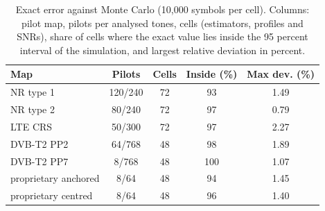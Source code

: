 \begin{table}[t]
\centering
\caption{Exact error against Monte Carlo (10,000 symbols per cell). Columns: pilot map, pilots per analysed tones, cells (estimators, profiles and SNRs), share of cells where the exact value lies inside the 95 percent interval of the simulation, and largest relative deviation in percent.}
\label{tab:validation}
\footnotesize
\setlength{\tabcolsep}{4pt}
\begin{tabular}{lcccc}
\toprule
Map & Pilots & Cells & Inside (\%) & Max dev. (\%) \\
\midrule
NR type 1 & 120/240 & 72 & 93 & 1.49 \\
NR type 2 & 80/240 & 72 & 97 & 0.79 \\
LTE CRS & 50/300 & 72 & 97 & 2.27 \\
DVB-T2 PP2 & 64/768 & 48 & 98 & 1.89 \\
DVB-T2 PP7 & 8/768 & 48 & 100 & 1.07 \\
proprietary anchored & 8/64 & 48 & 94 & 1.45 \\
proprietary centred & 8/64 & 48 & 96 & 1.40 \\
\bottomrule
\end{tabular}
\end{table}
